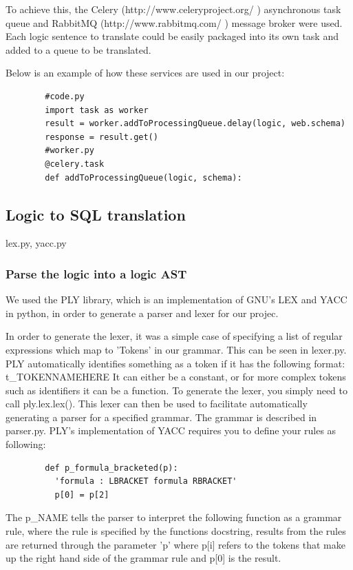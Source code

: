 \documentclass[a4paper, 11pt]{article}
\begin{document}
      



      To achieve this, the Celery (http://www.celeryproject.org/ ) asynchronous
      task queue and RabbitMQ (http://www.rabbitmq.com/ ) message broker were
      used. Each logic sentence to translate could be easily packaged into its
      own task and added to a queue to be translated.

      Below is an example of how these services are used in our project: 
      \begin{verbatim}
        #code.py
        import task as worker
        result = worker.addToProcessingQueue.delay(logic, web.schema)
        response = result.get()
        #worker.py
        @celery.task
        def addToProcessingQueue(logic, schema):
      \end{verbatim}



    \subsection{Logic to SQL translation}
    lex.py, yacc.py

    \subsubsection{Parse the logic into a logic AST}
      We used the PLY library, which is an implementation of GNU's LEX and YACC
      in python, in order to generate a parser and lexer for our projec.

      In order to generate the lexer, it was a simple case of specifying a list
      of regular expressions which map to 'Tokens' in our grammar. This can be
      seen in lexer.py. PLY automatically identifies something as a token if it
      has the following format: 
        t\_TOKENNAMEHERE
      It can either be a constant, or for more complex tokens such as
      identifiers it can be a function. To generate the lexer, you simply need to
      call ply.lex.lex(). This lexer can then be used to facilitate
      automatically generating a parser for a specified grammar. The grammar is
      described in parser.py. PLY's implementation of YACC requires you to
      define your rules as following:
      \begin{verbatim}
        def p_formula_bracketed(p):
          'formula : LBRACKET formula RBRACKET'
          p[0] = p[2]
      \end{verbatim}
      The p\_NAME tells the parser to interpret the following function as a
      grammar rule, where the rule is specified by the functions docstring,
      results from the rules are returned through the parameter 'p' where p[i]
      refers to the tokens that make up the right hand side of the grammar rule
      and p[0] is the result.
\end{document}
